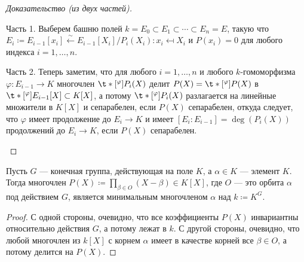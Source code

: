 \documentclass[
	extrafontsizes,
	11pt,
	hyphens,
]{memoir}
\begin{document}
\begin{proof}[Доказательство (из двух частей)]
~\begin{proofdescription}

\item[Часть 1.]
Выберем башню полей
\(k = E_0 \subset E_1 \subset \cdots{} \subset E_n = E\),
такую что \(E_i \coloneqq E_{i-1}[x_i] \xleftarrow{\sim} E_{i-1}[X_i] /P_i(X_i) : x_i \mapsfrom X_i\) и \(P(x_i)=0\) для любого
индекса
\(i = 1, \dots{}, n\).

\item[Часть 2.]
Теперь заметим, что для любого \(i = 1, \dots{}, n\) и любого \(k\)-го\-мо\-мор\-физ\-ма \(\varphi : E_{i-1} \to K\) многочлен \(\t*[^{\varphi}]{\smash{P_i}}{}(X)\) делит \(P(X) = \t*[^{\varphi}]{P}{}(X)\) в \(\t*[^{\varphi}]{\smash{E_{i-1}}}{}[X] \subset K[X]\),
а потому
\(\t*[^{\varphi}]{\smash{P_i}}{}(X)\) разлагается на линейные множители в \(K[X]\) и сепарабелен, если \(P(X)\) сепарабелен,
откуда следует, что
\(\varphi\) имеет продолжение до \(E_i \to K\) и имеет \([E_i : E_{i-1}] = \deg(P_i(X))\) продолжений до \(E_i \to K\), если \(P(X)\) сепарабелен.
\qedhere

\end{proofdescription}
\end{proof}

\begin{theorem}
Пусть \(G\) --- конечная группа, действующая на поле \(K\), а \(\alpha \in K\) --- элемент \(K\).
Тогда многочлен \(P(X) \coloneqq \prod_{\beta \in O} (X - \beta) \in K[X]\), где \(O\) --- это орбита \(\alpha\) под действием \(G\), является минимальным многочленом \(\alpha\) над \(k \coloneqq K^G\).
\end{theorem}

\begin{proof}
С одной стороны, очевидно, что все коэффициенты \(P(X)\) инвариантны относительно действия \(G\), а потому лежат в \(k\). С другой стороны, очевидно, что
любой многочлен из \(k[X]\) с корнем \(\alpha\) имеет в качестве корней все \(\beta \in O\), а потому делится на \(P(X)\).
\end{proof}

\end{document}
